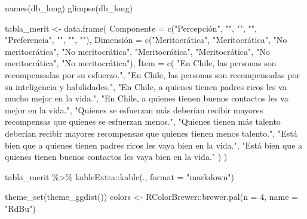 \documentclass[
  12pt,
]{article}
\newenvironment{Shaded}{\begin{snugshade}}{\end{snugshade}}
\newcommand{\AttributeTok}[1]{\textcolor[rgb]{0.40,0.45,0.13}{#1}}
\newcommand{\DecValTok}[1]{\textcolor[rgb]{0.68,0.00,0.00}{#1}}
\newcommand{\FunctionTok}[1]{\textcolor[rgb]{0.28,0.35,0.67}{#1}}
\newcommand{\NormalTok}[1]{\textcolor[rgb]{0.00,0.23,0.31}{#1}}
\newcommand{\OtherTok}[1]{\textcolor[rgb]{0.00,0.23,0.31}{#1}}
\newcommand{\SpecialCharTok}[1]{\textcolor[rgb]{0.37,0.37,0.37}{#1}}
\newcommand{\StringTok}[1]{\textcolor[rgb]{0.13,0.47,0.30}{#1}}
\begin{document}
\begin{Shaded}
\begin{Highlighting}[]
\FunctionTok{names}\NormalTok{(db\_long)}
\FunctionTok{glimpse}\NormalTok{(db\_long)}

\NormalTok{tabla\_merit }\OtherTok{\textless{}{-}} \FunctionTok{data.frame}\NormalTok{(}
  \AttributeTok{Componente =} \FunctionTok{c}\NormalTok{(}\StringTok{"Percepción"}\NormalTok{, }\StringTok{""}\NormalTok{, }\StringTok{""}\NormalTok{, }\StringTok{""}\NormalTok{, }
                 \StringTok{"Preferencia"}\NormalTok{, }\StringTok{""}\NormalTok{, }\StringTok{""}\NormalTok{, }\StringTok{""}\NormalTok{),}
\NormalTok{  Dimensión }\OtherTok{=} \FunctionTok{c}\NormalTok{(}\StringTok{"Meritocrática"}\NormalTok{, }\StringTok{"Meritocrática"}\NormalTok{, }
                \StringTok{"No meritocrática"}\NormalTok{, }\StringTok{"No meritocrática"}\NormalTok{,}
                \StringTok{"Meritocrática"}\NormalTok{, }\StringTok{"Meritocrática"}\NormalTok{, }
                \StringTok{"No meritocrática"}\NormalTok{, }\StringTok{"No meritocrática"}\NormalTok{),}
\NormalTok{  Í}\AttributeTok{tem =} \FunctionTok{c}\NormalTok{(}
    \StringTok{"En Chile, las personas son recompensadas por su esfuerzo."}\NormalTok{,}
    \StringTok{"En Chile, las personas son recompensadas por su inteligencia y habilidades."}\NormalTok{,}
    \StringTok{"En Chile, a quienes tienen padres ricos les va mucho mejor en la vida."}\NormalTok{,}
    \StringTok{"En Chile, a quienes tienen buenos contactos les va mejor en la vida."}\NormalTok{,}
    \StringTok{"Quienes se esfuerzan más deberían recibir mayores recompensas que quienes se esfuerzan menos."}\NormalTok{,}
    \StringTok{"Quienes tienen más talento deberían recibir mayores recompensas que quienes tienen menos talento."}\NormalTok{,}
    \StringTok{"Está bien que a quienes tienen padres ricos les vaya bien en la vida."}\NormalTok{,}
    \StringTok{"Está bien que a quienes tienen buenos contactos les vaya bien en la vida."}
\NormalTok{  )}
\NormalTok{)}

\NormalTok{tabla\_merit }\SpecialCharTok{\%\textgreater{}\%}\NormalTok{ kableExtra}\SpecialCharTok{::}\FunctionTok{kable}\NormalTok{(., }\AttributeTok{format =} \StringTok{"markdown"}\NormalTok{)}

\FunctionTok{theme\_set}\NormalTok{(}\FunctionTok{theme\_ggdist}\NormalTok{())}
\NormalTok{colors }\OtherTok{\textless{}{-}}\NormalTok{ RColorBrewer}\SpecialCharTok{::}\FunctionTok{brewer.pal}\NormalTok{(}\AttributeTok{n =} \DecValTok{4}\NormalTok{, }\AttributeTok{name =} \StringTok{"RdBu"}\NormalTok{)}


\end{Highlighting}
\end{Shaded}
\end{document}
